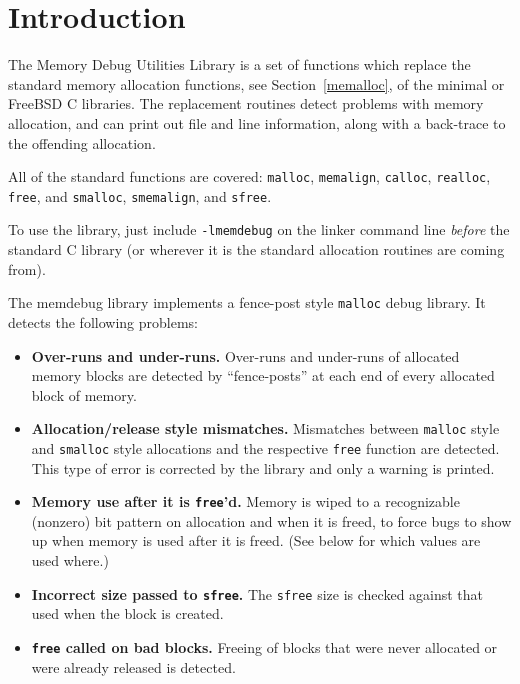 %
% 
%
\label{libmemdebug}
\label{memdebug}

\section{Introduction}

The Memory Debug Utilities Library is a 
set of functions which replace the standard \oskit{}
memory allocation functions, see Section~\ref{memalloc},
of the minimal or FreeBSD C libraries.  The replacement routines detect
problems with memory allocation, and can print out file and
line information, along with a back-trace to the offending 
allocation.

All of the standard functions are covered:
{\tt malloc}, {\tt memalign}, {\tt calloc}, {\tt realloc}, {\tt free},
and {\tt smalloc}, {\tt smemalign}, and {\tt sfree}.

To use the library, just include {\tt -lmemdebug}
on the linker command line
\emph{before} the standard C library (or wherever it is the standard
allocation routines are coming from).

The memdebug library implements a fence-post style {\tt malloc}
debug library.  It
detects the following problems:
\begin{itemize}
\item	{\bf Over-runs and under-runs.} 
	Over-runs and under-runs of allocated memory blocks are
	detected by ``fence-posts'' at each end of every allocated
	block of memory.  
\item	{\bf Allocation/release style mismatches.}
	Mismatches between {\tt malloc} style
	and {\tt smalloc} style allocations and the respective
	{\tt free} function are detected.  This type of error
	is corrected by the library and only a warning is printed. 
\item 	{\bf Memory use after it is {\tt free}'d.}
	Memory is wiped to a recognizable (nonzero) bit pattern
	on allocation and when it is freed,
	to force bugs to show up when memory is used after it is freed.  
	(See below for which values are used where.)
\item	{\bf Incorrect size passed to {\tt sfree}.}
	The {\tt sfree} size is checked against that used
	when the block is created.  
\item	{\bf {\tt free} called on bad blocks.}
	Freeing of blocks that were never allocated or were 
	already released is detected.
\end{itemize}

